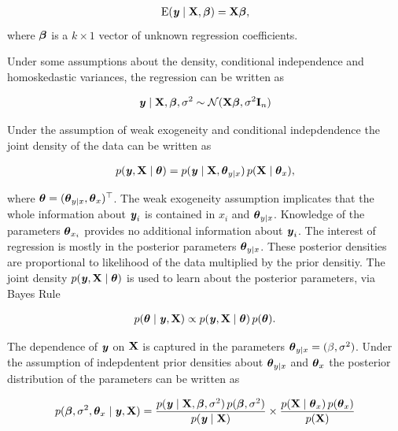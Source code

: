 \documentclass[11pt,a4paper,twoside]{book}\usepackage[]{graphicx}\usepackage[]{color}
\begin{document}
       \begin{align} 
\operatorname{E}({\textbf{\textit{y}}} \mid {\mathbf{X}} , {\boldsymbol{\beta}}) = {\mathbf{X}} {\boldsymbol{\beta}} ,
   \end{align}
where ${\boldsymbol{\beta}}$ is a $k \times 1$ vector of unknown regression coefficients.

Under some assumptions about the density, conditional independence and homoskedastic variances, the regression can be written as

       \begin{align} 
{\textbf{\textit{y}}} \mid {\mathbf{X}} , {\boldsymbol{\beta}}, \sigma^2 \sim \mathcal{N}({\mathbf{X}} {\boldsymbol{\beta}} , \sigma^2 {\mathbf{I}}_{n})
   \end{align}

Under the assumption of weak exogeneity and conditional indepdendence the joint density of the data can be written as

       \begin{align} 
p({\textbf{\textit{y}}}, {\mathbf{X}} \mid {\boldsymbol{\theta}}{}) = p({\textbf{\textit{y}}} \mid {\mathbf{X}}, {\boldsymbol{\theta}}{}_{y \mid x}) \, p({\mathbf{X}} \mid {\boldsymbol{\theta}}{}_{x}),
   \end{align}

where ${\boldsymbol{\theta}}{} = ({\boldsymbol{\theta}}{}_{y \mid x}, {\boldsymbol{\theta}}{}_{x})^\top$. The weak exogeneity assumption implicates that the whole information about ${\textbf{\textit{y}}}_{i}$ is contained in $x_{i}$ and ${\boldsymbol{\theta}}{}_{y \mid x}$. Knowledge of the parameters ${\boldsymbol{\theta}}{}_{x_{i}}$ provides no additional information about ${\textbf{\textit{y}}}_{i}$.
The interest of regression is mostly in the posterior parameters ${\boldsymbol{\theta}}{}_{y \mid x}$. These posterior densities are proportional to  likelihood of the data  multiplied by the prior densitiy. The joint density $p({\textbf{\textit{y}}}, {\mathbf{X}} \mid  {\boldsymbol{\theta}}{})$ is used to learn about the posterior parameters, via Bayes Rule

       \begin{align} 
p({\boldsymbol{\theta}}{} \mid {\textbf{\textit{y}}}, {\mathbf{X}}) \propto p({\textbf{\textit{y}}}, {\mathbf{X}} \mid  {\boldsymbol{\theta}}{}) \, p({\boldsymbol{\theta}}{}).
   \end{align}
   
   The dependence of ${\textbf{\textit{y}}}$ on ${\mathbf{X}}$ is captured in the parameters ${\boldsymbol{\theta}}{}_{y \mid x} = (\beta, \sigma^2)$. Under the assumption of indepdentent prior densities about ${\boldsymbol{\theta}}{}_{y \mid x}$ and ${\boldsymbol{\theta}}{}_{x}$ the posterior distribution of the parameters can be written as
   
          \begin{align} 
p({\boldsymbol{\beta}}, \sigma^2, {\boldsymbol{\theta}}{}_{x} \mid {\textbf{\textit{y}}}, {\mathbf{X}}) = \frac{p({\textbf{\textit{y}}} \mid {\mathbf{X}}, {\boldsymbol{\beta}}, \sigma^2) \, p({\boldsymbol{\beta}}, \sigma^2)}{p({\textbf{\textit{y}}} \mid {\mathbf{X}})} \times \frac{p({\mathbf{X}} \mid {\boldsymbol{\theta}}{}_{x}) \, p({\boldsymbol{\theta}}{}_{x})}{p({\mathbf{X}})}
   \end{align}
   
\end{document}

